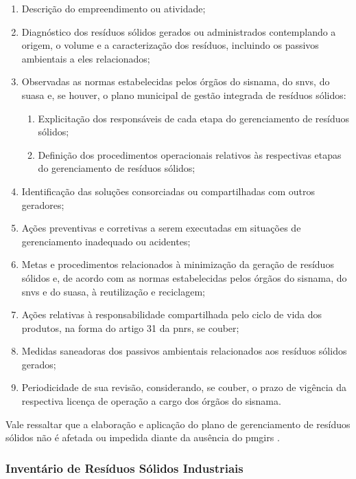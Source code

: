 \begin{enumerate}[label=\Roman*]
	\item Descrição do empreendimento ou atividade;
	\item Diagnóstico dos resíduos sólidos gerados ou administrados contemplando a origem, o volume e a caracterização dos resíduos, incluindo os passivos ambientais a eles relacionados;
	\item Observadas as normas estabelecidas pelos órgãos do \gls{sisnama}, do \gls{snvs}, do \gls{suasa} e, se houver, o plano municipal de gestão integrada de resíduos sólidos:
	\begin{enumerate}[label=(\alph*)] 
		\item Explicitação dos responsáveis de cada etapa do gerenciamento de resíduos sólidos;
		\item Definição dos procedimentos operacionais relativos às respectivas etapas do gerenciamento de resíduos sólidos;
	\end{enumerate}
	\item Identificação das soluções consorciadas ou compartilhadas com outros geradores;
	\item Ações preventivas e corretivas a serem executadas em situações de gerenciamento inadequado ou acidentes;
	\item Metas e procedimentos relacionados à minimização da geração de resíduos sólidos e, de acordo com as normas estabelecidas pelos órgãos do \gls{sisnama}, do \gls{snvs} e do \gls{suasa}, à reutilização e reciclagem;
	\item Ações relativas à responsabilidade compartilhada pelo ciclo de vida dos produtos, na forma do artigo 31 da \gls{pnrs}, se couber;
	\item Medidas saneadoras dos passivos ambientais relacionados aos resíduos sólidos gerados;
	\item Periodicidade de sua revisão, considerando, se couber, o prazo de vigência da respectiva licença de operação a cargo dos órgãos do \gls{sisnama}.
\end{enumerate}

Vale ressaltar que a elaboração e aplicação do plano de gerenciamento de resíduos sólidos não é afetada ou impedida diante da ausência do \gls{pmgirs} \cite{brasil:12305}.

\subsubsection{Inventário de Resíduos Sólidos Industriais}


